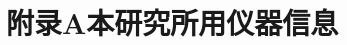 \chapter{附录A\quad 本研究所用仪器信息}
\renewcommand{\leftmark}{附录A\quad 本研究所用仪器信息}
\setcounter{chapter}{1}
\setcounter{figure}{0}
\setcounter{table}{0}
\renewcommand{\thechapter}{\Alph{chapter}}
\makeatletter
{}
\renewcommand{\thetable}{\arabic{table}}
\renewcommand{\thefigure}{\arabic{figure}}
\makeatother
\renewcommand{\thetable}{\thechapter\arabic{table}}
\renewcommand{\thefigure}{\thechapter\arabic{figure}}

\blindtext

\blindtext

\blindtext



